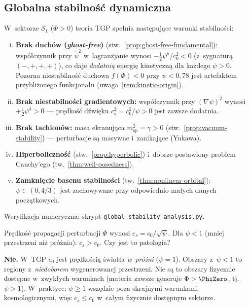 \subsection{Globalna stabilno\'s\'c dynamiczna}\label{ssec:global-stability}

\begin{theorem}\label{thm:global-stability}
W~sektorze $\mathcal{S}_1$ ($\Phi > 0$) teoria TGP spe\l{}nia
nast\k{e}puj\k{a}ce warunki stabilno\'sci:
\begin{enumerate}[(i)]
  \item \textbf{Brak duch\'ow (\emph{ghost-free})}
    (stw.~\ref{prop:ghost-free-fundamental}):
    wsp\'o\l{}czynnik przy $\dot\psi^2$ w~lagran\.zjanie
    wynosi $-\frac{1}{2}\psi^5/c_0^2 < 0$
    (z~sygnatur\k{a} $(-,+,+,+)$), co daje \emph{dodatni\k{a}}
    energi\k{e} kinetyczn\k{a} dla ka\.zdego $\psi > 0$.
    Pozorna niestabilno\'s\'c duchowa $f(\Phi) < 0$
    przy $\psi < 0{,}78$ jest artefaktem przybli\.zonego
    funkcjona\l{}u (uwaga~\ref{rem:kinetic-origin}).
  \item \textbf{Brak niestabilno\'sci gradientowych:}
    wsp\'o\l{}czynnik przy $(\nabla\psi)^2$ wynosi
    $+\frac{1}{2}\psi^4 > 0$ --- pr\k{e}dko\'s\'c d\'zwi\k{e}ku
    $c_s^2 = c_0^2/\psi > 0$ jest zawsze dodatnia.
  \item \textbf{Brak tachion\'ow:}
    masa ekranuj\k{a}ca $m_{\mathrm{sp}}^2 = \gamma > 0$
    (stw.~\ref{prop:vacuum-stability}) ---
    perturbacje s\k{a} masywne i~zanikaj\k{a}ce (Yukawa).
  \item \textbf{Hiperboliczno\'s\'c} (stw.~\ref{prop:hyperbolic})
    i~dobrze postawiony problem Cauchy'ego
    (tw.~\ref{thm:well-posedness}).
  \item \textbf{Zamkni\k{e}cie basenu stabilno\'sci}
    (tw.~\ref{thm:nonlinear-orbital}):
    $\psi \in (0, 4/3)$ jest zachowywane przy odpowiednio
    ma\l{}ych danych pocz\k{a}tkowych.
\end{enumerate}
Weryfikacja numeryczna: skrypt \texttt{global\_stability\_analysis.py}.
\end{theorem}

\begin{remark}[Superluminalność]%
\label{rem:superluminal}
Pr\k{e}dko\'s\'c propagacji perturbacji $\Phi$ wynosi
$c_s = c_0/\sqrt\psi$. Dla $\psi < 1$ (mniej przestrzeni
ni\.z pr\'o\.znia): $c_s > c_0$. Czy jest to patologia?

\textbf{Nie.} W~TGP $c_0$ jest pr\k{e}dko\'sci\k{a} \'swiat\l{}a
\emph{w~pr\'o\.zni} ($\psi = 1$). Obszary z~$\psi < 1$
to regiony z~\emph{niedoborem} wygenerowanej przestrzeni.
Nie s\k{a} to obszary fizycznie dost\k{e}pne
w~zwyk\l{}ych warunkach (materia zawsze generuje $\Phi > \PhiZero$,
tj.\ $\psi > 1$). W~praktyce: $\psi \geq 1$ wsz\k{e}dzie poza
skrajnymi warunkami kosmologicznymi, wi\k{e}c
$c_s \leq c_0$ w~ca\l{}ym fizycznie dost\k{e}pnym sektorze.
\end{remark}

